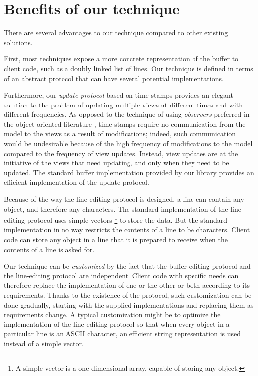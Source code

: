 \section{Benefits of our technique}
 
There are several advantages to our technique compared to other
existing solutions.

First, most techniques expose a more concrete representation of the
buffer to client code, such as a doubly linked list of lines.  Our
technique is defined in terms of an abstract \clos{} protocol that can
have several potential implementations.

Furthermore, our \emph{update protocol} based on time stamps provides
an elegant solution to the problem of updating multiple views at
different times and with different frequencies.  As opposed to the
technique of using \emph{observers} preferred in the object-oriented
literature \cite{Gamma:1998:DPC:551551}, time stamps require no
communication from the model to the views as a result of
modifications; indeed, such communication would be undesirable because
of the high frequency of modifications to the model compared to the
frequency of view updates.  Instead, view updates are at the
initiative of the views that need updating, and only when they need to
be updated.  The standard buffer implementation provided by our
library provides an efficient implementation of the update protocol.

Because of the way the line-editing protocol is designed, a line can
contain any \commonlisp{} object, and therefore any characters.  The
standard implementation of the line editing protocol uses simple
vectors%
\footnote{A simple vector is a \commonlisp{} one-dimensional array,
  capable of storing any \commonlisp{} object.}
to store the data.  But the standard implementation in no way
restricts the contents of a line to be characters.  Client code can
store any object in a line that it is prepared to receive when the
contents of a line is asked for.

Our technique can be \emph{customized} by the fact that the buffer
editing protocol and the line-editing protocol are independent.
Client code with specific needs can therefore replace the
implementation of one or the other or both according to its
requirements.  Thanks to the existence of the \clos{} protocol, such
customization can be done gradually, starting with the supplied
implementations and replacing them as requirements change.  A typical
customization might be to optimize the implementation of the
line-editing protocol so that when every object in a particular line
is an ASCII character, an efficient string representation is
used instead of a simple vector.

